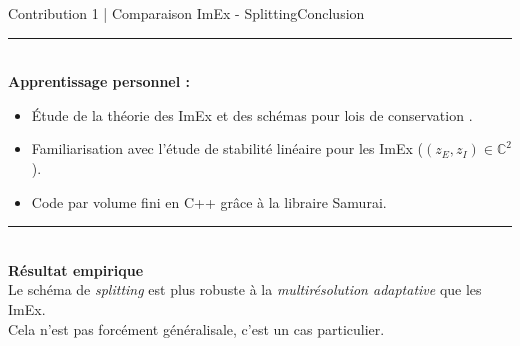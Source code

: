 \begin{frame}{Contribution 1 | Comparaison ImEx - Splitting}{Conclusion}
    \noindent\color{Primary}\rule{\linewidth}{0.6pt}\color{black}\\
    \textbf{Apprentissage personnel : }\\
    \begin{itemize}
        \item Étude de la théorie des ImEx \cite{Hairer1981,ASCHER1997151,KENNEDY2003139} et des schémas pour lois de conservation \cite{LeVeque1990}.
        \item Familiarisation avec l'étude de stabilité linéaire pour les ImEx ($(z_E,z_I) \in \mathbb{C}^2$).
        \item Code par volume fini en C++ grâce à la libraire Samurai.
    \end{itemize}
    \noindent\color{Primary}\rule{\linewidth}{0.6pt}\color{black}\\
    \textbf{Résultat empirique}\\
        Le schéma de \emph{splitting} est plus robuste à la \emph{multirésolution adaptative} que les ImEx.\\
        \scriptsize{Cela n'est pas forcément généralisale, c'est un cas particulier.}
\end{frame}